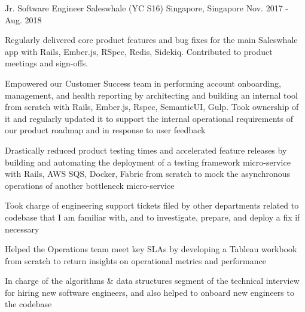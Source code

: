 

\begin{cventries}

  \cventry
    {Jr. Software Engineer} %
    {Saleswhale (YC S16)} %
    {Singapore, Singapore} %
    {Nov. 2017 - Aug. 2018} %
    {
      \begin{cvitems} %
      \item { Regularly delivered core product features and bug fixes for the main Saleswhale app with Rails, Ember.js, RSpec, Redis, Sidekiq. Contributed to product meetings and sign-offs.}
      \item { Empowered our Customer Success team in performing account onboarding, management, and health reporting by architecting and building an internal tool from scratch with Rails, Ember.js, Rspec, SemanticUI, Gulp. Took ownership of it and regularly updated it to support the internal operational requirements of our product roadmap and in response to user feedback}
      \item { Drastically reduced product testing times and accelerated feature releases by building and automating the deployment of a testing framework micro-service with Rails, AWS SQS, Docker, Fabric from scratch to mock the asynchronous operations of another bottleneck micro-service}
      \item { Took charge of engineering support tickets filed by other departments related to codebase that I am familiar with, and to investigate, prepare, and deploy a fix if necessary}
      \item { Helped the Operations team meet key SLAs by developing a Tableau workbook from scratch to return insights on operational metrics and performance }
      \item { In charge of the algorithms \& data structures segment of the technical interview for hiring new software engineers, and also helped to onboard new engineers to the codebase}
      \end{cvitems}
    }


\end{cventries}
